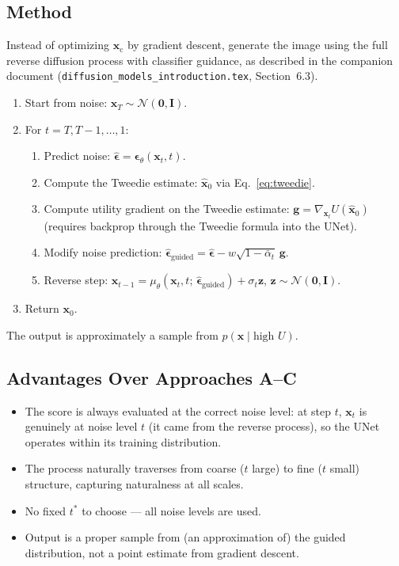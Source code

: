 \documentclass[11pt]{article}
\newcommand{\xb}{\mathbf{x}}
\newcommand{\xc}{\xb_{\mathrm{c}}}  %
\newcommand{\zb}{\mathbf{z}}
\newcommand{\eb}{\boldsymbol{\epsilon}}
\newcommand{\Ib}{\mathbf{I}}
\newcommand{\alphabar}{\bar{\alpha}}
\begin{document}
\subsection{Method}

Instead of optimizing $\xc$ by gradient descent, generate the image using the full
reverse diffusion process with classifier guidance, as described in the companion document
(\texttt{diffusion\_models\_introduction.tex}, Section~6.3).

\begin{enumerate}[nosep]
    \item Start from noise: $\xb_T \sim \mathcal{N}(\mathbf{0}, \Ib)$.
    \item For $t = T, T{-}1, \ldots, 1$:
    \begin{enumerate}[nosep]
        \item Predict noise: $\hat{\eb} = \eb_\theta(\xb_t, t)$.
        \item Compute the Tweedie estimate: $\hat{\xb}_0$ via Eq.~\eqref{eq:tweedie}.
        \item Compute utility gradient on the Tweedie estimate:
              $\mathbf{g} = \nabla_{\xb_t} U(\hat{\xb}_0)$
              (requires backprop through the Tweedie formula into the UNet).
        \item Modify noise prediction:
              $\hat{\eb}_{\mathrm{guided}} = \hat{\eb} - w\sqrt{1-\alphabar_t}\,\mathbf{g}$.
        \item Reverse step:
              $\xb_{t-1} = \mu_\theta(\xb_t, t;\, \hat{\eb}_{\mathrm{guided}}) + \sigma_t \zb$,
              $\zb \sim \mathcal{N}(\mathbf{0}, \Ib)$.
    \end{enumerate}
    \item Return $\xb_0$.
\end{enumerate}

The output is approximately a sample from $p(\xb \mid \text{high } U)$.

\subsection{Advantages Over Approaches A--C}

\begin{itemize}[nosep]
    \item The score is always evaluated at the correct noise level: at step $t$,
          $\xb_t$ is genuinely at noise level $t$ (it came from the reverse process),
          so the UNet operates within its training distribution.
    \item The process naturally traverses from coarse ($t$ large) to fine ($t$ small)
          structure, capturing naturalness at all scales.
    \item No fixed $t^*$ to choose --- all noise levels are used.
    \item Output is a proper sample from (an approximation of) the guided distribution,
          not a point estimate from gradient descent.
\end{itemize}
\end{document}
